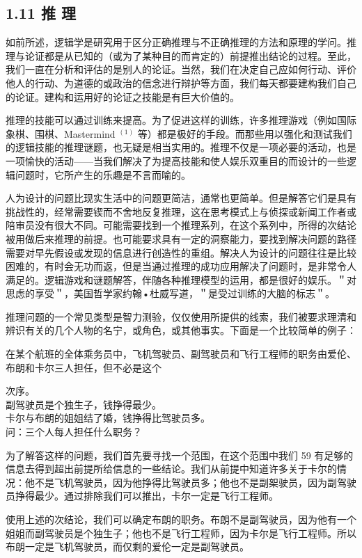 \subsection*{1.11 推 理}
如前所述，逻辑学是研究用于区分正确推理与不正确推理的方法和原理的学问。推理与论证都是从已知的（或为了某种目的而肯定的）前提推出结论的过程。至此，我们一直在分析和评估的是别人的论证。当然，我们在决定自己应如何行动、评价他人的行动、为道德的或政治的信念进行辩护等方面，我们每天都要建构我们自己的论证。建构和运用好的论证之技能是有巨大价值的。

推理的技能可以通过训练来提高。为了促进这样的训练，许多推理游戏（例如国际象棋、围棋、Mastermind ${ }^{(1)}$ 等）都是极好的手段。而那些用以强化和测试我们的逻辑技能的推理谜题，也无疑是相当实用的。推理不仅是一项必要的活动，也是一项愉快的活动——当我们解决了为提高技能和使人娱乐双重目的而设计的一些逻辑问题时，它所产生的乐趣是不言而喻的。

人为设计的问题比现实生活中的问题更简洁，通常也更简单。但是解答它们是具有挑战性的，经常需要锲而不舍地反复推理，这在思考模式上与侦探或新闻工作者或陪审员没有很大不同。可能需要找到一个推理系列，在这个系列中，所得的次结论被用做后来推理的前提。也可能要求具有一定的洞察能力，要找到解决问题的路径需要对早先假设或发现的信息进行创造性的重组。解决人为设计的问题往往是比较困难的，有时会无功而返，但是当通过推理的成功应用解决了问题时，是非常令人满足的。逻辑游戏和谜题解答，伴随各种推理模型的运用，都是很好的娱乐。＂对思虑的享受＂，美国哲学家约翰•杜威写道，＂是受过训练的大脑的标志＂。

推理问题的一个常见类型是智力测验，仅仅使用所提供的线索，我们被要求理清和辨识有关的几个人物的名宁，或角色，或其他事实。下面是一个比较简单的例子：

在某个航班的全体乘务员中，飞机驾驶员、副驾驶员和飞行工程师的职务由爱伦、布朗和卡尔三人担任，但不必是这个

次序。\\
副驾驶员是个独生子，钱挣得最少。\\
卡尔与布朗的姐姐结了婚，钱挣得比驾驶员多。\\
问：三个人每人担任什么职务？

为了解答这样的问题，我们首先要寻找一个范围，在这个范围中我们 59 有足够的信息去得到超出前提所给信息的一些结论。我们从前提中知道许多关于卡尔的情况：他不是飞机驾驶员，因为他挣得比驾驶员多；他也不是副桇驶员，因为副驾驶员挣得最少。通过排除我们可以推出，卡尔一定是飞行工程师。

使用上述的次结论，我们可以确定布朗的职务。布朗不是副驾驶员，因为他有一个姐姐而副驾驶员是个独生子；他也不是飞行工程师，因为卡尔是飞行工程师。所以布朗一定是飞机驾驶员，而仅剩的爱伦一定是副驾驶员。

